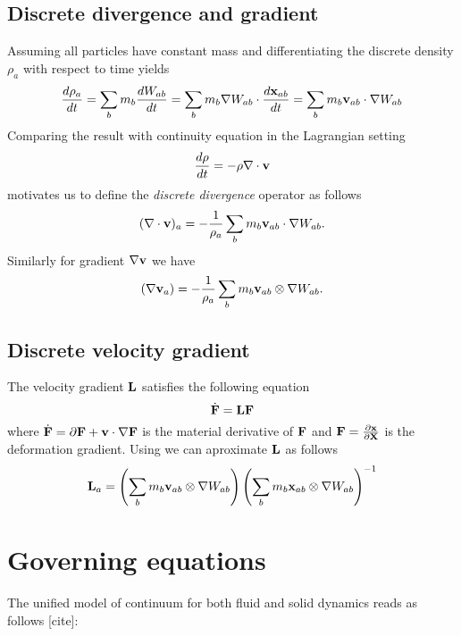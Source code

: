 \subsection{Discrete divergence and gradient}
Assuming all particles have constant mass and differentiating the discrete density $\rho_a$ with respect to time yields
\begin{equation}
    \frac{d\rho_a}{dt} = \sum_b m_b \frac{dW_{ab}}{dt} = \sum_b m_b \nabla W_{ab} \cdot \frac{d{\mathbf{x}}_{ab}}{dt} = \sum_b m_b {\mathbf{v}}_{ab} \cdot \nabla W_{ab}
\end{equation}
Comparing the result with continuity equation in the Lagrangian setting 
\begin{equation}
    \frac{d\rho}{dt} = - \rho \nabla \cdot \mathbf{v}
\end{equation}
motivates us to define the \emph{discrete divergence} operator as follows
\begin{equation}
    (\nabla \cdot \mathbf{v})_a = - \frac{1}{\rho_a}\sum_b m_b {\mathbf{v}}_{ab} \cdot \nabla W_{ab}.
\label{eq:sphdiv}
\end{equation}
Similarly for gradient $\nabla {\mathbf{v}}$ we have
\begin{equation}
    (\nabla {\mathbf{v}}_a) = - \frac{1}{\rho_a}\sum_b m_b {\mathbf{v}}_{ab} \otimes \nabla W_{ab}.
\label{eq:sphgrad}
\end{equation}

\subsection{Discrete velocity gradient}
The velocity gradient $\mathbf{L}$ satisfies the following equation
\begin{equation}
    \dot{\mathbf{F}} = \mathbf{L} \mathbf{F}
\end{equation}
where $\dot{\mathbf{F}} = \partial \mathbf{F} + \mathbf{v} \cdot \nabla \mathbf{F}$ is the material derivative of $\mathbf{F}$ and $\mathbf{F} = \frac{\partial \mathbf{x}}{\partial \mathbf{X}}$ is the deformation gradient.
Using  we can aproximate $\mathbf{L}$ as follows
\begin{equation}
    {\mathbf{L}}_a = \left(\sum_{b}m_b{\mathbf{v}}_{ab}\otimes \nabla W_{ab}\right) \left(\sum_{b}m_b{\mathbf{x}}_{ab}\otimes \nabla W_{ab}\right)^{-1}
\end{equation}
\section{Governing equations}
The unified model of continuum for both fluid and solid dynamics reads as follows [cite]:
\begin{subequations}
    
\end{subequations}


